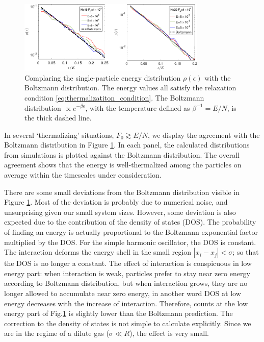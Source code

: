 \documentclass[onecolumn,pra]{revtex4-1}
\begin{document}
\begin{figure}[tbph]
\includegraphics[width=0.8\textwidth]{ZhiyuPictures/Boltzmann_log_2panels_01-crop.pdf}
%
\caption{\label{fig:thermalization9} Complaring the single-particle energy distribution
  $\rho(\epsilon)$ with the Boltzmann distribution.  The energy values all satisfy the relaxation
  condition \eqref{eq:thermalizatiton_condition}.  The Boltzmann distribution $\propto
  e^{-\beta\epsilon}$, with the temperature defined as $\beta^{-1}= E/N$, is the thick dashed line.}
\end{figure}


In several `thermalizing' situations, $F_0\gtrsim E/N$, we display the agreement with the Boltzmann
distribution in Figure \ref{fig:thermalization9}.  In each panel, the calculated distributions from
simulations is plotted against the Boltzmann distribution.  The overall agreement shows that the
energy is well-thermalized among the particles on average within the timescales under consideration.


There are some small deviations from the Boltzmann distribution visible in Figure
\ref{fig:thermalization9}.  Most of the deviation is probably due to numerical noise, and
unsurprising given our small system sizes.  However, some deviation is also expected due to the
contribution of the density of states (DOS).  The probability of finding an energy is actually
proportional to the Boltzmann exponential factor multiplied by the DOS.  For the simple harmonic
oscillator, the DOS is constant.  The interaction deforms the energy shell in the small region
$|x_i-x_j|<\sigma$; so that the DOS is no longer a constant.  The effect of interaction is
conspicuous in low energy part: when interaction is weak, particles prefer to stay near zero energy
according to Boltzmann distribution, but when interaction grows, they are no longer allowed to
accumulate near zero energy, in another word DOS at low energy decreases with the increase of
interaction. Therefore, counts at the low energy part of Fig.\ref{fig:thermalization9} is slightly
lower than the Boltzmann prediction.  The correction to the density of states is not simple to
calculate explicitly.  Since we are in the regime of a dilute gas ($\sigma\ll R$), the effect is
very small.
\end{document}
